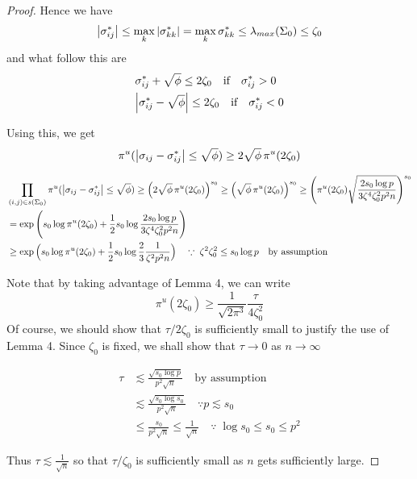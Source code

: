 \begin{proof}
    Hence we have
    \begin{align*}
        \abs{\sigma_{ij}^*} \leq \max_k{\abs{\sigma_{kk}^*}} = \max_k \sigma_{kk}^* \leq \lambda_{max}(\Sigma_0) \leq \zeta_0
    \end{align*}
    and what follow this are 
    \begin{align*}
        &\sigma_{ij}^* + \sqrt{\phi} \leq 2\zeta_0 \quad \text{if} \quad \sigma_{ij}^* >0 \\
        &\abs{\sigma_{ij}^* - \sqrt{\phi}} \leq 2\zeta_0 \quad \text{if} \quad \sigma_{ij}^* < 0
    \end{align*}

    Using this, we get \[\pi^u(\abs{\sigma_{ij} - \sigma_{ij}^*}\leq \sqrt \phi) \geq 2\sqrt{\phi}\, \pi^u(2\zeta_0)\]

    \begin{align*}
        &\prod_{(i,j)\in s(\Sigma_0)}\pi^u(\abs{\sigma_{ij} - \sigma_{ij}^*}\leq \sqrt \phi) \geq \Big(2\sqrt{\phi}\, \pi^u(2\zeta_0) \Big)^{s_0} \geq \Big(\sqrt{\phi}\, \pi^u(2\zeta_0) \Big)^{s_0} \geq \Bigg(\pi^u(2\zeta_0)\sqrt{\frac{2s_0\log p}{3\zeta^4 \zeta_0^2 p^2 n}} \Bigg)^{s_0} \\
        &= \exp\Bigg(s_0\log \pi^u(2\zeta_0) + \frac 12 s_0 \log \frac{2s_0\log p}{3\zeta^4\zeta_0^2p^2 n} \Bigg) \\
        &\geq \exp\Big(s_0 \log \pi^u(2\zeta_0) + \frac 12 s_0 \log \frac 23\frac{1}{\zeta^2p^2n} \Big) \quad \because\; \zeta^2 \zeta_0^2 \leq s_0\log p \quad \text{by assumption}
    \end{align*}

    Note that by taking advantage of Lemma 4, we can write
    \[\pi^u(2\zeta_0)\geq \frac{1}{\sqrt{2\pi^3}}\frac{\tau}{4\zeta_0^2} \]
    Of course, we should show that $\tau/2\zeta_0$ is sufficiently small to justify the use of Lemma 4. Since $\zeta_0$ is fixed, we shall show that $\tau \rightarrow 0$ as $n\rightarrow \infty$

    \begin{align*}
        \tau & \lesssim \frac{\sqrt{s_0\log p}}{p^2\sqrt{n}}  \quad \text{by assumption} \\
        & \lesssim \frac{\sqrt{s_0\log s_0}}{p^2\sqrt{n}} \quad \because p \lesssim s_0 \\ 
        &\leq  \frac{s_0}{p^2\sqrt{n}} \leq \frac{1}{\sqrt{n}} \quad \because \; \log s_0 \leq s_0 \leq p^2 
    \end{align*}

    Thus $\tau \lesssim \frac{1}{\sqrt{n}}$ so that $\tau / \zeta_0$ is sufficiently small as $n$ gets sufficiently large.


\end{proof}

